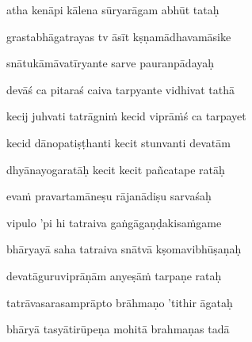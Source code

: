 atha kenāpi kālena sūryarāgam abhūt tataḥ\thinspace{\dandab} \dontdisplaylinenum

grastabhāgatrayas tv āsīt kṣṇamādhavamāsike \veg\dontdisplaylinenum

snātukāmāvatīryante sarve pauranpādayaḥ\thinspace{\dandab} \dontdisplaylinenum

devāś ca pitaraś caiva tarpyante vidhivat tathā \veg\dontdisplaylinenum
{}

kecij juhvati tatrāgniṁ kecid viprāṁś ca tarpayet\thinspace{\dandab} \dontdisplaylinenum

kecid dānopatiṣṭhanti kecit stunvanti devatām \veg\dontdisplaylinenum
{}

dhyānayogaratāḥ kecit kecit pañcatape ratāḥ\thinspace{\dandab} \dontdisplaylinenum

evaṁ pravartamāneṣu rājanādiṣu sarvaśaḥ \veg\dontdisplaylinenum
{}

vipulo 'pi hi tatraiva gaṅgāgaṇḍakisaṁgame\thinspace{\dandab} \dontdisplaylinenum

bhāryayā saha tatraiva snātvā kṣomavibhūṣaṇaḥ \veg\dontdisplaylinenum
{}

devatāguruviprāṇām anyeṣāṁ tarpaṇe rataḥ\thinspace{\dandab} \dontdisplaylinenum

tatrāvasarasamprāpto brāhmaṇo 'tithir āgataḥ \veg\dontdisplaylinenum
{}

bhāryā tasyātirūpeṇa mohitā brahmaṇas tadā\thinspace{\dandab} \dontdisplaylinenum

